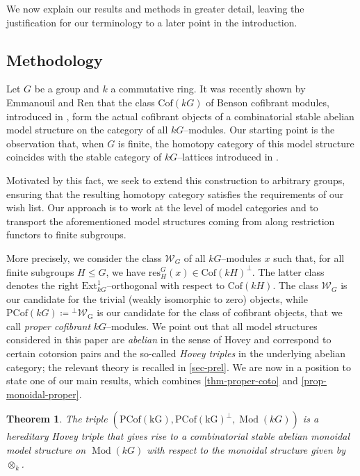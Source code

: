 \documentclass{amsart}
\DeclareMathOperator{\Mod}{Mod}
\numberwithin{equation}{section}%
\newtheorem{thmx}{Theorem}
\theoremstyle{remark}
\begin{document}
We now explain our results and methods in greater detail, leaving the justification for our terminology to a later point in the introduction.

\subsection*{Methodology} Let $G$ be a group and $k$ a commutative ring. It was recently shown by Emmanouil and Ren \cite{ET_cof} that the class $\mathrm{Cof}(kG)$ of Benson cofibrant modules, introduced in \cite{Ben98}, form the actual cofibrant objects of a combinatorial stable abelian model structure on the category of all $kG$--modules. Our starting point is the observation that, when $G$ is finite, the homotopy category of this model structure coincides with the stable category of $kG$--lattices introduced in \cite{BBIKP25}. 

Motivated by this fact, we seek to extend this construction to arbitrary groups, ensuring that the resulting homotopy category satisfies the requirements of our wish list. Our approach is to work at the level of model categories and to transport the aforementioned model structures coming from \cite{ET_cof} along restriction functors to finite subgroups.


More precisely, we consider the class $\mathcal{W}_G$ of all $kG$--modules $x$ such that, for all finite subgroups $H\leqslant G$, we have $\mathrm{res}^G_H(x)\in\mathrm{Cof}(kH)^{\bot}$. The latter class denotes the right $\mathrm{Ext}^1_{kG}$--orthogonal with respect to $\mathrm{Cof}(kH)$. The class $\mathcal{W}_G$ is our candidate for the trivial (weakly isomorphic to zero) objects, while $\mathrm{PCof}(kG)\coloneqq {}^{\perp}\mathcal{W}_{\mathrm{G}}$ is our candidate for the class of cofibrant objects, that we call \textit{proper cofibrant} $kG$--modules. We point out that all model structures considered in this paper are \textit{abelian} in the sense of Hovey \cite{Hov02} and correspond to certain cotorsion pairs and the so-called \textit{Hovey triples} in the underlying abelian category; the relevant theory is recalled in \cref{sec-prel}.
We are now in a position to state one of our main results, which combines \cref{thm-proper-coto} and \cref{prop-monoidal-proper}.

\begin{thmx}
    The triple $(\mathrm{PCof(kG),\mathrm{PCof}(kG)^{\perp}},\Mod(kG))$ is a hereditary Hovey triple that gives rise to a combinatorial stable abelian monoidal model structure on $\Mod(kG)$ with respect to the monoidal structure given by $\otimes_k$. 
\end{thmx}
\end{document}
